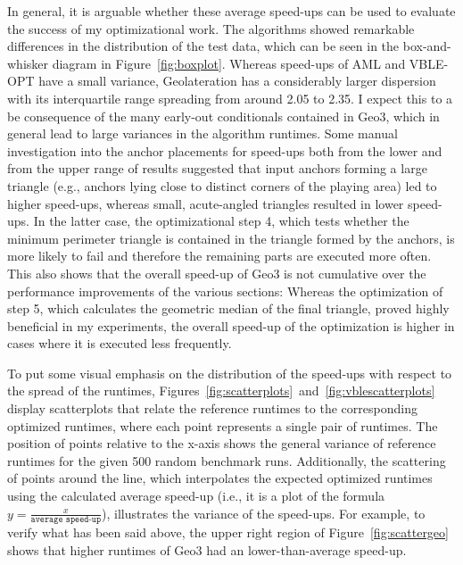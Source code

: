 In general, it is arguable whether these average speed-ups can be used to evaluate the success of my optimizational work. The algorithms showed remarkable differences in the distribution of the test data, which can be seen in the box-and-whisker diagram in Figure~\ref{fig:boxplot}. Whereas speed-ups of AML and VBLE-OPT have a small variance, Geolateration has a considerably larger dispersion with its interquartile range spreading from around 2.05 to 2.35. I expect this to a be consequence of the many early-out conditionals contained in Geo3, which in general lead to large variances in the algorithm runtimes. Some manual investigation into the anchor placements for speed-ups both from the lower and from the upper range of results suggested that input anchors forming a large triangle (e.g., anchors lying close to distinct corners of the playing area) led to higher speed-ups, whereas small, acute-angled triangles resulted in lower speed-ups. In the latter case, the optimizational step 4, which tests whether the minimum perimeter triangle is contained in the triangle formed by the anchors, is more likely to fail and therefore the remaining parts are executed more often. This also shows that the overall speed-up of Geo3 is not cumulative over the performance improvements of the various sections: Whereas the optimization of step 5, which calculates the geometric median of the final triangle, proved highly beneficial in my experiments, the overall speed-up of the optimization is higher in cases where it is executed less frequently.

To put some visual emphasis on the distribution of the speed-ups with respect to the spread of the runtimes, Figures~\ref{fig:scatterplots}~and~\ref{fig:vblescatterplots} display scatterplots that relate the reference runtimes to the corresponding optimized runtimes, where each point represents a single pair of runtimes. The position of points relative to the x-axis shows the general variance of reference runtimes for the given 500 random benchmark runs. Additionally, the scattering of points around the line, which interpolates the expected optimized runtimes using the calculated average speed-up (i.e., it is a plot of the formula $y = \frac{x}{\texttt{average speed-up}}$), illustrates the variance of the speed-ups. For example, to verify what has been said above, the upper right region of Figure~\ref{fig:scattergeo} shows that higher runtimes of Geo3 had an lower-than-average speed-up.

